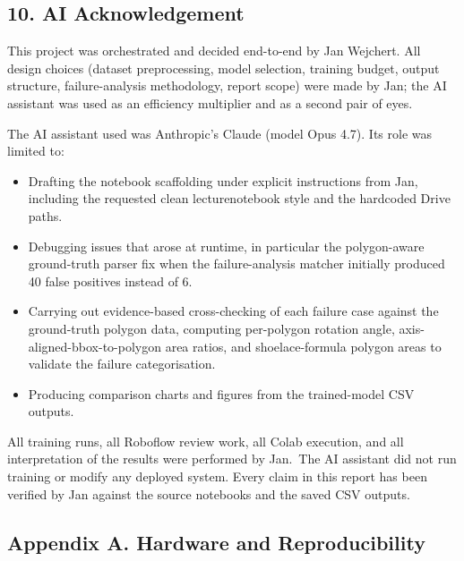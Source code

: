 \documentclass[11pt
]{article}
\providecommand{\tightlist}{%
  \setlength{\itemsep}{0pt}\setlength{\parskip}{0pt}}
\begin{document}
\newpage
\subsection{10. AI Acknowledgement}\label{ai-acknowledgement}

This project was orchestrated and decided end-to-end by Jan Wejchert.
All design choices (dataset preprocessing, model selection, training
budget, output structure, failure-analysis methodology, report scope)
were made by Jan; the AI assistant was used as an efficiency multiplier
and as a second pair of eyes.

The AI assistant used was Anthropic's Claude (model Opus 4.7). Its role
was limited to:

\begin{itemize}
\tightlist
\item
  Drafting the notebook scaffolding under explicit instructions from
  Jan, including the requested clean lecturenotebook style and the
  hardcoded Drive paths.
\item
  Debugging issues that arose at runtime, in particular the
  polygon-aware ground-truth parser fix when the failure-analysis
  matcher initially produced 40 false positives instead of 6.
\item
  Carrying out evidence-based cross-checking of each failure case
  against the ground-truth polygon data, computing per-polygon rotation
  angle, axis-aligned-bbox-to-polygon area ratios, and shoelace-formula
  polygon areas to validate the failure categorisation.
\item
  Producing comparison charts and figures from the trained-model CSV
  outputs.
\end{itemize}

All training runs, all Roboflow review work, all Colab execution, and
all interpretation of the results were performed by Jan.~The AI
assistant did not run training or modify any deployed system. Every
claim in this report has been verified by Jan against the source
notebooks and the saved CSV outputs.

\subsection{Appendix A. Hardware and
Reproducibility}\label{appendix-a.-hardware-and-reproducibility}
\end{document}

